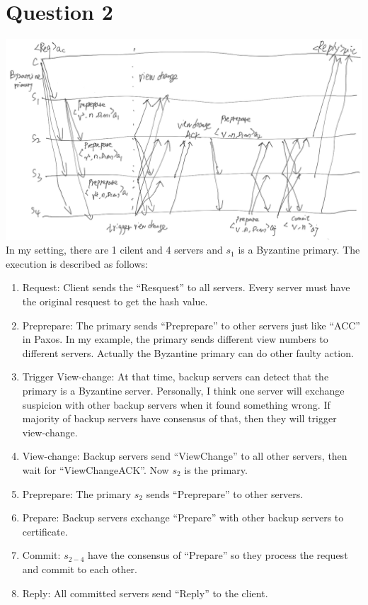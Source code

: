 \documentclass{article}
\begin{document}
\section*{Question 2}
\includegraphics[width=\textwidth]{hw3_2}
In my setting, there are 1 cilent and 4 servers and $s_1$ is a Byzantine primary. The execution is described as follows:
\begin{enumerate}
  \item Request: Client sends the ``Resquest'' to all servers. Every server must have the original resquest to get the hash value.
  \item Preprepare: The primary sends ``Preprepare'' to other servers just like ``ACC'' in Paxos. In my example, the primary sends different view numbers to different servers. Actually the Byzantine primary can do other faulty action.
  \item Trigger View-change: At that time, backup servers can detect that the primary is a Byzantine server. Personally, I think one server will exchange suspicion with other backup servers when it found something wrong. If majority of backup servers have consensus of that, then they will trigger view-change.
  \item View-change: Backup servers send ``ViewChange'' to all other servers, then wait for ``ViewChangeACK''. Now $s_2$ is the primary.
  \item Preprepare: The primary $s_2$ sends ``Preprepare'' to other servers.
  \item Prepare: Backup servers exchange ``Prepare'' with other backup servers to certificate.
  \item Commit: $s_{2-4}$ have the consensus of ``Prepare'' so they process the request and commit to each other.
  \item Reply: All committed servers send ``Reply'' to the client.
\end{enumerate}
\end{document}
